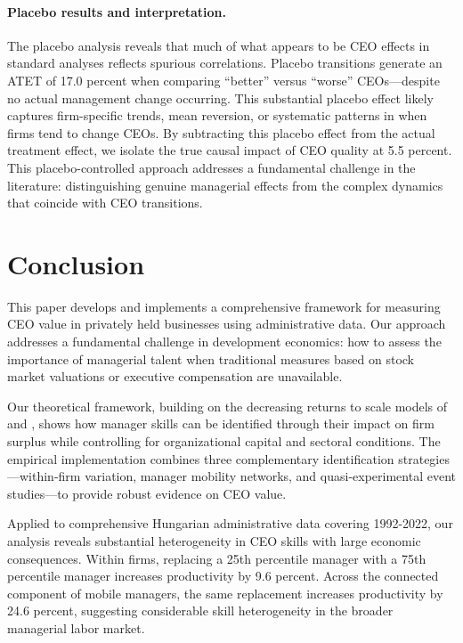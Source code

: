 \documentclass[11pt,a4paper]{article}
\begin{document}
\paragraph{Placebo results and interpretation.} The placebo analysis reveals that much of what appears to be CEO effects in standard analyses reflects spurious correlations. Placebo transitions generate an ATET of 17.0 percent when comparing ``better'' versus ``worse'' CEOs---despite no actual management change occurring. This substantial placebo effect likely captures firm-specific trends, mean reversion, or systematic patterns in when firms tend to change CEOs. By subtracting this placebo effect from the actual treatment effect, we isolate the true causal impact of CEO quality at 5.5 percent. This placebo-controlled approach addresses a fundamental challenge in the literature: distinguishing genuine managerial effects from the complex dynamics that coincide with CEO transitions. 

\section{Conclusion}

This paper develops and implements a comprehensive framework for measuring CEO value in privately held businesses using administrative data. Our approach addresses a fundamental challenge in development economics: how to assess the importance of managerial talent when traditional measures based on stock market valuations or executive compensation are unavailable.

Our theoretical framework, building on the decreasing returns to scale models of \citet{AtkesonKehoe2005JPE} and \citet{McGrattan2012RED}, shows how manager skills can be identified through their impact on firm surplus while controlling for organizational capital and sectoral conditions. The empirical implementation combines three complementary identification strategies---within-firm variation, manager mobility networks, and quasi-experimental event studies---to provide robust evidence on CEO value.

Applied to comprehensive Hungarian administrative data covering 1992-2022, our analysis reveals substantial heterogeneity in CEO skills with large economic consequences. Within firms, replacing a 25th percentile manager with a 75th percentile manager increases productivity by 9.6 percent. Across the connected component of mobile managers, the same replacement increases productivity by 24.6 percent, suggesting considerable skill heterogeneity in the broader managerial labor market.
\end{document}
